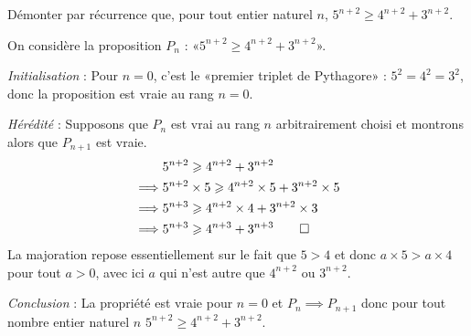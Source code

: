 \documentclass[12pt,a4paper,french]{article}
\begin{document}
\begin{question}[subtitle={Récurrence encore}]
  Démonter par récurrence que, pour tout entier naturel $n$, $5^{n+2}
  \geqslant 4^{n+2} + 3^{n+2}$.
\end{question}
\begin{solution}
  On considère la proposition $P_n$ : «$5^{n+2} \geqslant 4^{n+2} + 3^{n+2}$».

  \emph{Initialisation} : Pour $n = 0$, c'est le «premier triplet de
  Pythagore» : $5^2 = 4^2 = 3^2$, donc la proposition est vraie au rang $n =
  0$.

  \emph{Hérédité} : Supposons que $P_n$ est vrai au rang $n$ arbitrairement
  choisi et montrons alors que $P_{n+1}$ est vraie.
  \begin{align*}
             & 5^{n+2} \geqslant 4^{n+2} + 3^{n+2}                            \\
    \implies & 5^{n+2} \times 5 \geqslant 4^{n+2} \times 5 + 3^{n+2} \times 5 \\
    \implies & 5^{n+3} \geqslant 4^{n+2} \times 4 + 3^{n+2} \times 3          \\
    \implies & 5^{n+3} \geqslant 4^{n+3} + 3^{n+3} \qed
  \end{align*}
  La majoration repose essentiellement sur le fait que $5 > 4$ et donc $a
  \times 5 > a \times 4$ pour tout $a > 0$, avec ici $a$ qui n'est autre que
  $4^{n+2}$ ou $3^{n+2}$.

  \emph{Conclusion} : La propriété est vraie pour $n = 0$  et $P_n \implies
  P_{n+1}$ donc pour tout nombre entier naturel $n$ $5^{n+2} \geqslant
  4^{n+2} + 3^{n+2}$.
\end{solution}
\end{document}
